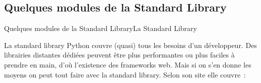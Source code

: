 \documentclass{beamer}
\begin{document}
    \subsection{Quelques modules de la Standard Library}\label{subsec:std-modules}

    \begin{frame}{Quelques modules de la Standard Library}{La Standard Library}
        \begin{tiny}
            La standard library Python couvre (quasi) tous les besoins d'un développeur.
            Des librairies distantes dédiées peuvent être plus performantes ou plus faciles à prendre en main, d'où l'existence des frameworks web.
            Mais si on s'en donne les moyens on peut tout faire avec la standard library.
            \bigbreak
            Selon son site elle couvre~:


\end{tiny}
\end{frame}
\end{document}
